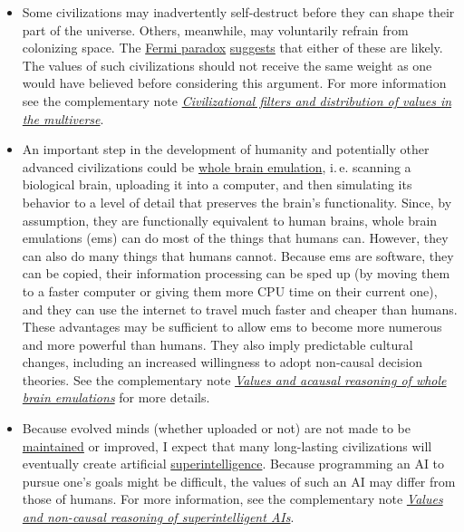 \begin{itemize}
\item
  Some civilizations may inadvertently self-destruct before they can
  shape their part of the universe. Others, meanwhile, may voluntarily
  refrain from colonizing space. The
  \href{https://en.wikipedia.org/wiki/Fermi_paradox}{Fermi
  paradox}
  \href{https://www.youtube.com/watch?v=aspMV6ERqpo}{suggests}
  that either of these are likely. The values of such civilizations
  should not receive the same weight as one would have believed before
  considering this argument. For more information see the
  complementary note \href{https://foundational-research.org/files/Civilizational-filters-and-the-Fermi-paradox.pdf}{\emph{Civilizational filters and distribution of values in the multiverse}}. 
\item
  An important step in the development of humanity and potentially other
  advanced civilizations could be
  \href{https://en.wikipedia.org/wiki/Mind_uploading}{whole brain
  emulation}, i.\,e. scanning a biological brain, uploading it into a
  computer, and then simulating its behavior to a level of detail that
  preserves the brain's functionality. Since, by assumption, they are
  functionally equivalent to human brains, whole brain emulations (ems)
  can do most of the things that humans can. However, they can also do
  many things that humans cannot. Because ems are software, they can be
  copied, their information processing can be sped up (by moving them to
  a faster computer or giving them more CPU time on their current one),
  and they can use the internet to travel much faster and cheaper than
  humans. These advantages may be sufficient to allow ems to become more
  numerous and more powerful than humans. They also imply predictable
  cultural changes, including an increased willingness to adopt
  non-causal decision theories. See the
  complementary note \href{https://foundational-research.org/files/Whole-brain-emulation.pdf}{\emph{Values and acausal reasoning of whole brain emulations}} for
  more details. 
\item
  Because evolved minds (whether uploaded or not) are not made to be
  \href{https://en.wikipedia.org/wiki/Software_maintenance}{maintained}
  or improved, I expect that many long-lasting civilizations will
  eventually create artificial
  \href{https://en.wikipedia.org/wiki/Superintelligence}{superintelligence}.
  Because programming an AI to pursue one's goals might be difficult,
  the values of such an AI may differ from those of humans. For more
  information, see the complementary
  note \href{https://foundational-research.org/files/Superintelligent-AIs.pdf}{\emph{Values and non-causal reasoning of superintelligent AIs}}.
\end{itemize}

